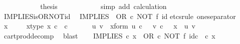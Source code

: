 \begin{isabellebody}
\ \ \ \ \ \ \ \ \isamarkupfalse%
\ \isamarkupfalse%
\ {\isacharquery}{\kern0pt}thesis\isanewline
\ \ \ \ \ \ \ \ \ \ \isamarkupfalse%
\ {\isacharparenleft}{\kern0pt}simp\ add{\isacharcolon}{\kern0pt}\ calculation{\isacharparenright}{\kern0pt}\isanewline
\ \ \ \ \ \ \isamarkupfalse%
\isanewline
\ \ \ \ \isamarkupfalse%
\isanewline
\ \ \isamarkupfalse%
\isanewline
{}\isamarkupfalse%
%
\endisatagproof
{\isafoldproof}%
%
\isadelimproof
\isanewline
%
\endisadelimproof
\isanewline
{}\isamarkupfalse%
\ IMPLIES{\isacharunderscore}{\kern0pt}is{\isacharunderscore}{\kern0pt}OR{\isacharunderscore}{\kern0pt}NOT{\isacharunderscore}{\kern0pt}id{\isacharcolon}{\kern0pt}\isanewline
\ \ {\isachardoublequoteopen}IMPLIES\ {\isacharequal}{\kern0pt}\ OR\ {\isasymcirc}\isactrlsub c\ {\isacharparenleft}{\kern0pt}NOT\ {\isasymtimes}\isactrlsub f\ id{\isacharparenleft}{\kern0pt}{\isasymOmega}{\isacharparenright}{\kern0pt}{\isacharparenright}{\kern0pt}{\isachardoublequoteclose}\isanewline
%
\isadelimproof
%
\endisadelimproof
%
\isatagproof
{}\isamarkupfalse%
{\isacharparenleft}{\kern0pt}etcs{\isacharunderscore}{\kern0pt}rule\ one{\isacharunderscore}{\kern0pt}separator{\isacharparenright}{\kern0pt}\isanewline
\ \ \isamarkupfalse%
\ x\ \isanewline
\ \ \isamarkupfalse%
\ x{\isacharunderscore}{\kern0pt}type{\isacharcolon}{\kern0pt}\ {\isachardoublequoteopen}x\ {\isasymin}\isactrlsub c\ {\isasymOmega}\ {\isasymtimes}\isactrlsub c\ {\isasymOmega}{\isachardoublequoteclose}\isanewline
\ \ \isamarkupfalse%
\ \isamarkupfalse%
\ u\ v\ \ x{\isacharunderscore}{\kern0pt}form{\isacharcolon}{\kern0pt}\ {\isachardoublequoteopen}u\ {\isasymin}\isactrlsub c\ {\isasymOmega}\ {\isasymand}\ v\ {\isasymin}\isactrlsub c\ {\isasymOmega}\ {\isasymand}\ x\ {\isacharequal}{\kern0pt}\ {\isasymlangle}u{\isacharcomma}{\kern0pt}\ v{\isasymrangle}{\isachardoublequoteclose}\isanewline
\ \ \ \ \isamarkupfalse%
\ cart{\isacharunderscore}{\kern0pt}prod{\isacharunderscore}{\kern0pt}decomp\ \isamarkupfalse%
\ blast\isanewline
\ \ \isamarkupfalse%
\ {\isachardoublequoteopen}IMPLIES\ {\isasymcirc}\isactrlsub c\ x\ {\isacharequal}{\kern0pt}\ {\isacharparenleft}{\kern0pt}OR\ {\isasymcirc}\isactrlsub c\ NOT\ {\isasymtimes}\isactrlsub f\ id\isactrlsub c\ {\isasymOmega}{\isacharparenright}{\kern0pt}\ {\isasymcirc}\isactrlsub c\ x{\isachardoublequoteclose}\isanewline

\end{isabellebody}
